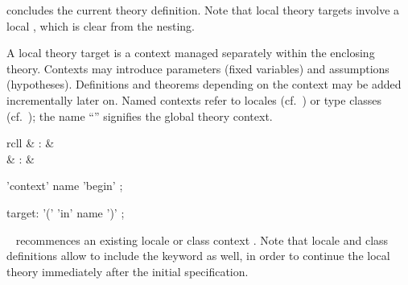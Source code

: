 \begin{isabellebody}
\begin{isamarkuptext}
\begin{description}
  \item \hyperlink{command.global.end}{\mbox{}} concludes the current theory
  definition.  Note that local theory targets involve a local
  \hyperlink{command.local.end}{\mbox{}}, which is clear from the nesting.

  \end{description}%
\end{isamarkuptext}%
\isamarkuptrue%
%
\isamarkuptrue%
%
\begin{isamarkuptext}%
A local theory target is a context managed separately within the
  enclosing theory.  Contexts may introduce parameters (fixed
  variables) and assumptions (hypotheses).  Definitions and theorems
  depending on the context may be added incrementally later on.  Named
  contexts refer to locales (cf.\ ) or type classes
  (cf.\ ); the name ``\isa{{\isachardoublequote}{\isacharminus}{\isachardoublequote}}'' signifies the
  global theory context.

  \begin{matharray}{rcll}
    \hypertarget{command.context}{\hyperlink{command.context}{\mbox{}}} & : &  \\
    \hypertarget{command.local.end}{\hyperlink{command.local.end}{\mbox{}}} & : &  \\
  \end{matharray}

  \begin{rail}
    'context' name 'begin'
    ;

    target: '(' 'in' name ')'
    ;
  \end{rail}

  \begin{description}
  
  \item \hyperlink{command.context}{\mbox{}}~ recommences an
  existing locale or class context .  Note that locale and
  class definitions allow to include the \hyperlink{keyword.begin}{\mbox{}} keyword as
  well, in order to continue the local theory immediately after the
  initial specification.
  

\end{description}
\end{isamarkuptext}
\end{isabellebody}
